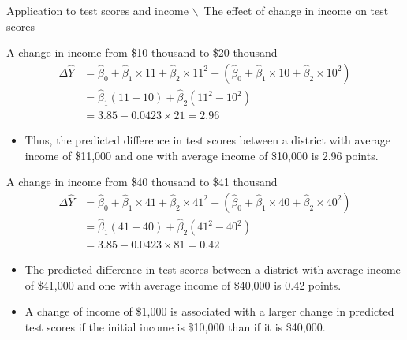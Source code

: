 \documentclass[presentation,10pt]{beamer}
\begin{document}
\begin{frame}[shrink,label={sec:org00253e2}]{Application to test scores and income $\backslash$\ \small The effect of change in income on test scores}
\begin{block}{A change in income from \$10 thousand to \$20 thousand}
\begin{equation*}
\begin{split}
\Delta \hat{Y} &= \hat{\beta}_0 + \hat{\beta}_1 \times 11 + \hat{\beta}_2 \times 11^2 - (\hat{\beta}_0 + \hat{\beta}_1 \times 10 + \hat{\beta}_2 \times 10^2) \\
&= \hat{\beta}_1 (11 - 10) + \hat{\beta}_2(11^2 - 10^2) \\
& = 3.85 - 0.0423 \times 21 = 2.96
\end{split}
\end{equation*}
\begin{itemize}
\item Thus, the predicted difference in test scores between a district with
average income of \$11,000 and one with average income of \$10,000 is
2.96 points.
\end{itemize}
\end{block}

\begin{block}{A change in income from \$40 thousand to \$41 thousand}
\begin{equation*}
\begin{split}
\Delta \hat{Y} &= \hat{\beta}_0 + \hat{\beta}_1 \times 41 + \hat{\beta}_2 \times 41^2 - (\hat{\beta}_0 + \hat{\beta}_1 \times 40 + \hat{\beta}_2 \times 40^2) \\
&= \hat{\beta}_1 (41 - 40) + \hat{\beta}_2(41^2 - 40^2) \\
& = 3.85 - 0.0423 \times 81 = 0.42
\end{split}
\end{equation*}
\begin{itemize}
\item The predicted difference in test scores between a district with
average income of \$41,000 and one with average income of \$40,000 is
0.42 points.
\item A change of income of \$1,000 is associated with a
larger change in predicted test scores if the initial income is
\$10,000 than if it is \$40,000.
\end{itemize}
\end{block}
\end{frame}
\end{document}

